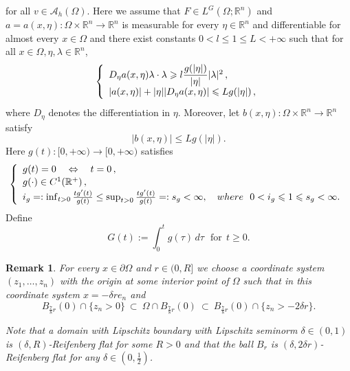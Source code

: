 \documentclass[10pt,a4paper]{amsart}
\newtheorem{remark}{Remark}
\begin{document}
for all $v \in \mathcal{A}_{h}(\Omega)$. Here we
assume that $F \in L^G(\Omega;\mathbb{R}^n)$ and  $a=a(x,\eta): \Omega \times\mathbb{R}^n \rightarrow \mathbb{R}^n$ is measurable for every $\eta \in \mathbb{R}^n$  and differentiable for almost every $x\in \Omega$  and there exist constants $0<l\leqslant 1 \leqslant L<+\infty$ such that for all $x \in \Omega,\eta,\lambda \in \mathbb{R}^n$,   
\begin{eqnarray} \label{u1}
	\left\{\begin{array}{r@{}c@{}ll}
		&&D_{\eta} a(x,\eta )\lambda \cdot \lambda \geqslant l\dfrac{g(|\eta|)}{|\eta|}|\lambda|^2 \,, \\[0.05cm]
		&&|a(x,\eta)|+|\eta||D_{\eta} a(x,\eta )|\leqslant Lg(|\eta|)\,, \\[0.05cm]
	\end{array}\right.
\end{eqnarray}
where $D_{\eta}$ denotes the differentiation in $\eta$.  
Moreover, let $b(x,\eta): \Omega \times\mathbb{R}^n \rightarrow \mathbb{R}^n$  satisfy
\begin{equation}\label{u2}
	|b(x,\eta)|\leqslant L g(|\eta|).
\end{equation}
Here $g(t) : [0,+\infty)\rightarrow [0,+\infty)$ satisfies
\begin{eqnarray}\label{u3}
	\left\{\begin{array}{r@{}c@{}ll}
		&&g(t)=0 \ \ \ \Leftrightarrow \ \ \   t=0 \,, \\[0.05cm]
		&&g(\cdot)\in C^{1}(\mathbb{R}^+)\,, \\[0.05cm]
		&&   i_{g}=: \inf_{t>0}\frac{tg'(t)}{g(t)}\leq \sup_{t>0}\frac{tg'(t)}{g(t)}=:s_{g}<\infty, \ \ \  where \ \  0< i_{g} \leqslant 1 \leqslant s_{g} <\infty. \, \\[0.05cm]
	\end{array}\right.
\end{eqnarray}
Define
\begin{equation}\label{g}
	G(t):= \int_0^tg(\tau)\,d\tau  \ \ \ \mbox{for}\ \ t\geq0.
\end{equation}

\begin{remark}\label{rei}
	For every $x \in \partial \Omega$ and $r \in (0,R]$ we choose a coordinate system $(z_1,\dots,z_n)$ with the origin at some interior point of $  \Omega$ such that in this coordinate system $x=- \delta re_n$ and
	$$
	B_{\frac{7}{8}r}(0)\cap \{z_n>0\} \ \subset\ \Omega\cap B_{\frac{7}{8}r}(0)\ \subset\ B_{\frac{7}{8}r}(0)\cap \{z_n>-2\delta r\}.
	$$
	
	
	Note that a domain with Lipschitz boundary with Lipschitz seminorm $\delta\in(0,1)$
	is $(\delta,R)$-Reifenberg flat for some $R>0$ and that the ball $B_r$ is $(\delta,2\delta r)$-Reifenberg flat for any $\delta\in (0,\frac{1}{2})$.
\end{remark}
\end{document}
